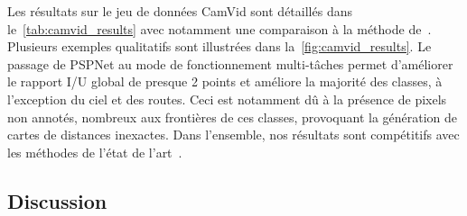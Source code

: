 Les résultats sur le jeu de données CamVid sont détaillés dans le~\cref{tab:camvid_results} avec notamment une comparaison à la méthode de~\cite{jegou_one_2017}. Plusieurs exemples qualitatifs sont illustrées dans la~\cref{fig:camvid_results}. Le passage de PSPNet au mode de fonctionnement multi-tâches permet d'améliorer le rapport I/U global de presque 2 points et améliore la majorité des classes, à l'exception du ciel et des routes. Ceci est notamment dû à la présence de pixels non annotés, nombreux aux frontières de ces classes, provoquant la génération de cartes de distances inexactes. Dans l'ensemble, nos résultats sont compétitifs avec les méthodes de l'état de l'art~\cite{jegou_one_2017,l._c._chen_deeplab:_2017}.

\subsection{Discussion}



